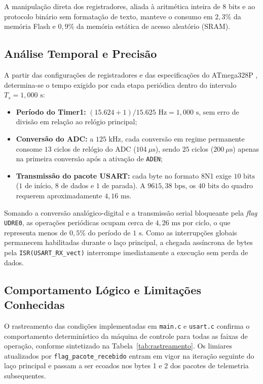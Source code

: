 \documentclass[conference]{IEEEtran}
\begin{document}
A manipulação direta dos registradores, aliada à aritmética inteira de 8 bits e ao protocolo binário sem formatação de texto, manteve o consumo em $2{,}3\%$ da memória Flash e $0{,}9\%$ da memória estática de acesso aleatório (SRAM).

\subsection{Análise Temporal e Precisão}
A partir das configurações de registradores e das especificações do ATmega328P \cite{ref_atmel}, determina-se o tempo exigido por cada etapa periódica dentro do intervalo $T_s = 1{,}000\text{ s}$:
\begin{itemize}
	\item \textbf{Período do Timer1:} $(15{.}624 + 1) / 15{.}625\text{ Hz} = 1{,}000\text{ s}$, sem erro de divisão em relação ao relógio principal;
	\item \textbf{Conversão do ADC:} a $125\text{ kHz}$, cada conversão em regime permanente consome $13$ ciclos de relógio do ADC ($104\ \mu\text{s}$), sendo $25$ ciclos ($200\ \mu\text{s}$) apenas na primeira conversão após a ativação de \texttt{ADEN};
	\item \textbf{Transmissão do pacote USART:} cada byte no formato 8N1 exige $10\text{ bits}$ ($1$ de início, $8$ de dados e $1$ de parada). A $9615{,}38\text{ bps}$, os $40\text{ bits}$ do quadro requerem aproximadamente $4{,}16\text{ ms}$.
\end{itemize}

Somando a conversão analógico-digital e a transmissão serial bloqueante pela \textit{flag} \texttt{UDRE0}, as operações periódicas ocupam cerca de $4{,}26\text{ ms}$ por ciclo, o que representa menos de $0{,}5\%$ do período de $1\text{ s}$. Como as interrupções globais permanecem habilitadas durante o laço principal, a chegada assíncrona de bytes pela \texttt{ISR(USART\_RX\_vect)} interrompe imediatamente a execução sem perda de dados.

\subsection{Comportamento Lógico e Limitações Conhecidas}
O rastreamento das condições implementadas em \texttt{main.c} e \texttt{usart.c} confirma o comportamento determinístico da máquina de controle para todas as faixas de operação, conforme sintetizado na Tabela~\ref{tab:rastreamento}. Os limiares atualizados por \texttt{flag\_pacote\_recebido} entram em vigor na iteração seguinte do laço principal e passam a ser ecoados nos bytes 1 e 2 dos pacotes de telemetria subsequentes.
\end{document}
